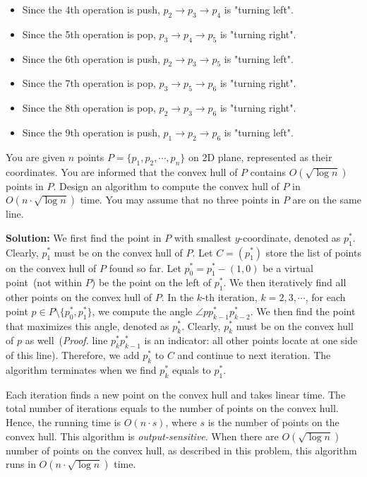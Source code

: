 \documentclass[11pt]{article}
\begin{document}
\begin{qunlist}
\begin{enumerate}
    \begin{itemize}
        \item Since the 4th operation is push, $p_2 \to p_3 \to p_4$ is "turning left".
        \item Since the 5th operation is pop, $p_3 \to p_4 \to p_5$ is "turning right".
        \item Since the 6th operation is push, $p_2 \to p_3 \to p_5$ is "turning left".
        \item Since the 7th operation is pop, $p_3 \to p_5 \to p_6$ is "turning right".
        \item Since the 8th operation is pop, $p_2 \to p_3 \to p_6$ is "turning right".
        \item Since the 9th operation is push, $p_1 \to p_2 \to p_6$ is "turning left".
    \end{itemize}
\end{enumerate}


You are given $n$ points $P = \{ p_1, p_2 , \cdots, p_n \}$ on 2D plane, represented as
their coordinates. You are informed that the convex hull of $P$ contains 
$O(\sqrt{\log n})$ points in $P$.  Design an algorithm to compute the convex
hull of $P$ in $O(n\cdot \sqrt{\log n})$ time. You may assume that no three points in $P$ are on the
same line.

{\bf Solution:} We first find the point in $P$ with smallest $y$-coordinate, denoted as $p^*_1$.
Clearly, $p^*_1$ must be on the convex hull of $P$. Let $C = (p^*_1)$ store the list of points on the convex hull of $P$ found so far.
Let $p^*_0 = p^*_1 - (1, 0)$ be a virtual point~(not within $P$)
be the point on the left of $p^*_1$.  We then iteratively find all other points on the convex hull of $P$.
In the $k$-th iteration, $k = 2, 3, \cdots$, for each point $p\in P\setminus\{p^*_0, p^*_1\}$,
we compute the angle $\angle p p^*_{k-1} p^*_{k-2}$. We then find the point that maximizes this angle, denoted as $p^*_k$.
Clearly, $p^*_k$ must be on the convex hull of $p$ as well~(\emph{Proof.} line $p^*_kp^*_{k-1}$ is an indicator:
all other points locate at one side of this line). Therefore, we add $p^*_k$ to $C$ and continue to next iteration.
The algorithm terminates when we find $p^*_k$ equals to $p^*_1$.

Each iteration finds a new point on the convex hull and takes linear time.
The total number of iterations equals to the number of points on the convex hull.
Hence, the running time is $O(n\cdot s)$, where $s$ is the number of points on the convex hull.
This algorithm is \emph{output-sensitive}. When there are $O(\sqrt{\log n})$ number of points on the convex hull, as described
in this problem, this algorithm runs in $O(n\cdot \sqrt{\log n})$ time.



\end{qunlist}
\end{document}

